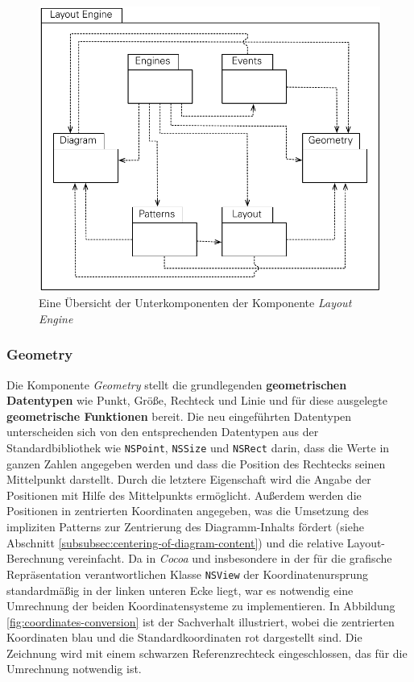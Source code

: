 \begin{figure}[hbt]
    \centering
    \includegraphics[scale=0.85]{assets/layout-engine-subcomponents}
    \caption{Eine Übersicht der Unterkomponenten der Komponente \textit{Layout Engine}}
    \label{fig:layout-engine-subcomponents}
\end{figure}

\subsubsection{Geometry}
\label{subsubsec:geometry}

Die Komponente \textit{Geometry} stellt die grundlegenden \textbf{geometrischen Datentypen} wie Punkt, Größe, Rechteck und Linie und für diese ausgelegte \textbf{geometrische Funktionen} bereit. Die neu eingeführten Datentypen unterscheiden sich von den entsprechenden Datentypen aus der Standardbibliothek wie \texttt{NSPoint}, \texttt{NSSize} und \texttt{NSRect} darin, dass die Werte in ganzen Zahlen angegeben werden und dass die Position des Rechtecks seinen Mittelpunkt darstellt. Durch die letztere Eigenschaft wird die Angabe der Positionen mit Hilfe des Mittelpunkts ermöglicht. Außerdem werden die Positionen in zentrierten Koordinaten angegeben, was die Umsetzung des impliziten Patterns zur Zentrierung des Diagramm-Inhalts fördert (siehe Abschnitt \ref{subsubsec:centering-of-diagram-content}) und die relative Layout-Berechnung vereinfacht. Da in \textit{Cocoa} und insbesondere in der für die grafische Repräsentation verantwortlichen Klasse \texttt{NSView} der Koordinatenursprung standardmäßig in der linken unteren Ecke liegt, war es notwendig eine Umrechnung der beiden Koordinatensysteme zu implementieren. In Abbildung \ref{fig:coordinates-conversion} ist der Sachverhalt illustriert, wobei die zentrierten Koordinaten blau und die Standardkoordinaten rot dargestellt sind. Die Zeichnung wird mit einem schwarzen Referenzrechteck eingeschlossen, das für die Umrechnung notwendig ist.

